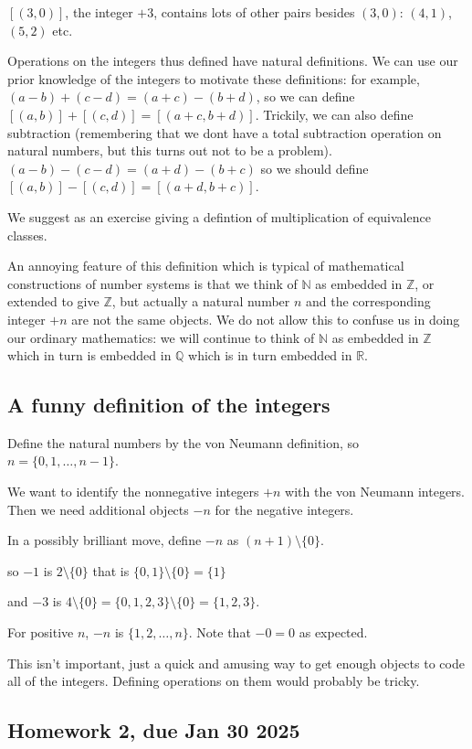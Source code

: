 \documentclass[12pt]{article}
\begin{document}
$[(3,0)]$, the integer $+3$, contains lots of other pairs besides $(3,0)$:  $(4,1)$, $(5,2)$ etc.

Operations on the integers thus defined have natural definitions.  We can use our prior knowledge of the integers to motivate these definitions:  for example, $(a-b)+(c-d) = (a+c)-(b+d)$, so we can define $[(a,b)]+[(c,d)] = [(a+c,b+d)]$.
Trickily, we can also define subtraction (remembering that we dont have a total subtraction operation on natural numbers, but this turns out not to be a problem).  $(a-b)-(c-d) = (a+d)-(b+c)$ so we should define $[(a,b)]-[(c,d)] = [(a+d,b+c)]$.


We suggest as an exercise giving a defintion of multiplication of equivalence classes.

An annoying feature of this definition which is typical of mathematical constructions of number systems is
that we think of $\mathbb N$ as embedded in $\mathbb Z$, or extended to give $\mathbb Z$, but actually a natural number $n$ and the corresponding integer $+n$ are not the same objects.  We do not allow this to confuse us in doing our ordinary mathematics:  we will continue to think of $\mathbb N$ as embedded in $\mathbb Z$ which in turn is embedded in $\mathbb Q$ which is in turn embedded in $\mathbb R$.


\subsection{A funny definition of the integers}

Define the natural numbers by the von Neumann definition, so $n = \{0,1,\ldots,n-1\}$.

We want to identify the nonnegative integers $+n$ with the von Neumann integers.  Then we need additional
objects $-n$ for the negative integers.

In a possibly brilliant move, define $-n$ as $(n+1)\setminus \{0\}$.

so $-1$ is $2 \setminus \{0\}$ that is $\{0,1\} \setminus \{0\} = \{1\}$

and $-3$ is $4 \setminus \{0\} = \{0,1,2,3\} \setminus \{0\} = \{1,2,3\}$.

For positive $n$, $-n$ is $\{1,2,\ldots,n\}$.  Note that $-0=0$ as expected.

This isn't important, just a quick and amusing way to get enough objects to code all of the integers.  Defining operations on them would probably be tricky.

\subsection{Homework 2, due Jan 30 2025}
\end{document}
